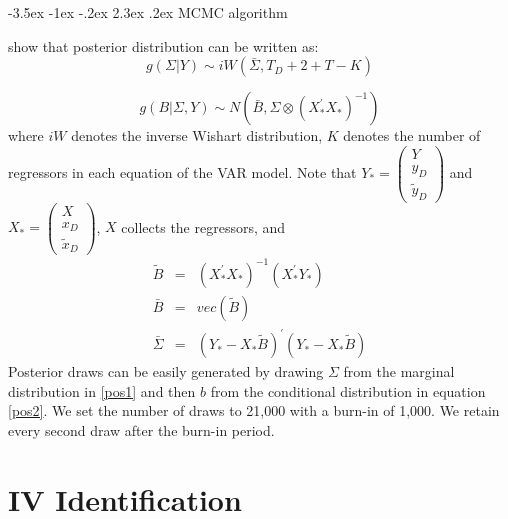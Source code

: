\documentclass[a4paper,12pt]{article}%
\makeatletter
\renewcommand\subsection{\@startsection {subsection}{2}{\z@}%
                  {-3.5ex \@plus -1ex \@minus -.2ex}%
                  {2.3ex \@plus.2ex}%
                  {\centering\normalsize\scshape\color{black}}}
\makeatother
\begin{document}
\subsection{MCMC algorithm}

\citet{banbura2007bayesian} show that posterior distribution can be written
as:%
\begin{equation}
g\left( \Sigma |Y\right) \sim iW\left( \bar{\Sigma},T_{D}+2+T-K\right) 
\label{pos1}
\end{equation}

\begin{equation}
g\left( B|\Sigma ,Y\right) \sim N\left( \bar{B},\Sigma \otimes \left(
X_{\ast }^{\prime }X_{\ast }\right) ^{-1}\right)   \label{pos2}
\end{equation}%
where $iW$ denotes the inverse Wishart distribution, $K$ denotes the number of regressors in each
equation of the VAR model. Note that  $Y_{\ast }=\left( 
\begin{array}{c}
Y \\ 
y_{D} \\ 
\tilde{y}_{D}%
\end{array}%
\right) $ and $X_{\ast }=\left( 
\begin{array}{c}
X \\ 
x_{D} \\ 
\tilde{x}_{D}%
\end{array}%
\right) $, $X$ collects the regressors, and 
\begin{eqnarray*}
\tilde{B} &=&\left( X_{\ast }^{\prime }X_{\ast }\right) ^{-1}\left( X_{\ast
}^{\prime }Y_{\ast }\right)  \\
\bar{B} &=&vec\left( \tilde{B}\right)  \\
\bar{\Sigma} &=&\left( Y_{\ast }-X_{\ast }\tilde{B}\right) ^{\prime }\left(
Y_{\ast }-X_{\ast }\tilde{B}\right) 
\end{eqnarray*}%
Posterior draws can be easily generated by drawing $\Sigma $ from the
marginal distribution in \ref{pos1} and then $b$ from the conditional
distribution in equation \ref{pos2}. We set the number of draws to 21,000
with a burn-in of 1,000. We retain every second draw after the burn-in period. 

\section{IV Identification}\label{A:IV}
\end{document}
